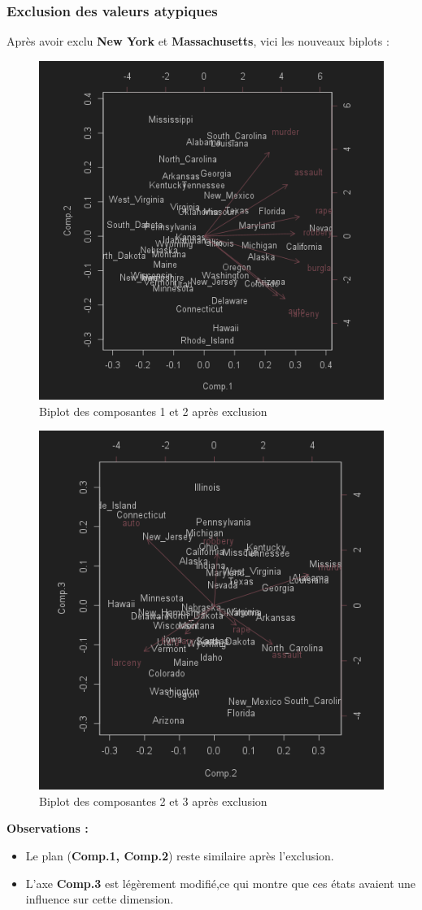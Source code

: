 \documentclass{article}
\begin{document}
    \subsubsection{Exclusion des valeurs atypiques}

    Après avoir exclu \textbf{New York} et \textbf{Massachusetts}, vici les nouveaux biplots :

    \begin{figure}[H]
        \centering
        \includegraphics[width=0.5\linewidth]{img/bigplotcrimeacp3}
        \caption{Biplot des composantes 1 et 2 après exclusion}
    \end{figure}

    \begin{figure}[H]
        \centering
        \includegraphics[width=0.6\linewidth]{img/bigplotcrimeacp4}
        \caption{Biplot des composantes 2 et 3 après exclusion}
    \end{figure}

    \textbf{Observations :}
    \begin{itemize}
        \item Le plan (\textbf{Comp.1, Comp.2}) reste similaire après l’exclusion.
        \item L’axe \textbf{Comp.3} est légèrement modifié,ce qui montre que ces états avaient une influence sur cette dimension.
    \end{itemize}
\end{document}
